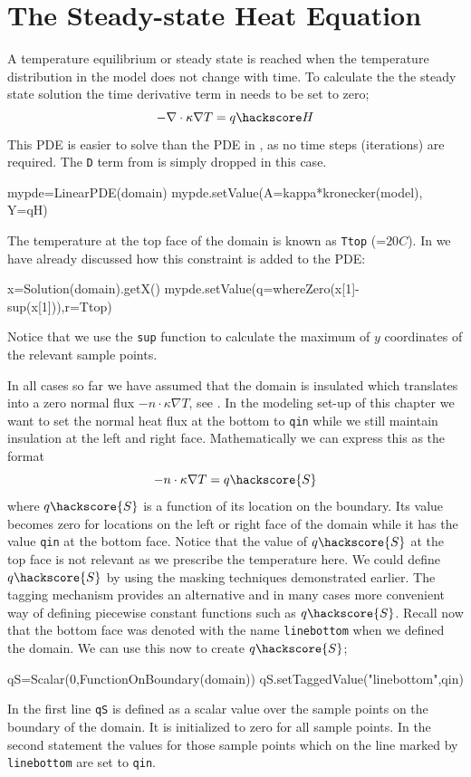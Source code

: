 \section{The Steady-state Heat Equation}
A temperature equilibrium or steady state is reached when the temperature
distribution in the model does not change with time. To calculate the 
the steady state solution the time derivative term in 
needs to be set to zero;
\begin{equation}\label{eqn:Tform nabla steady}
-\nabla \cdot \kappa \nabla T = q\hackscore H
\end{equation}
This PDE is easier to solve than the PDE in , as no time
steps (iterations) are required. The \verb|D| term from  is
simply dropped in this case.
\begin{python}
mypde=LinearPDE(domain)
mypde.setValue(A=kappa*kronecker(model), Y=qH)
\end{python}
The temperature at the top face of the domain is known as \verb|Ttop| (=$20 C$).
In  we have 
already discussed how this constraint is added to the PDE:
\begin{python}
x=Solution(domain).getX()
mypde.setValue(q=whereZero(x[1]-sup(x[1])),r=Ttop)
\end{python}
Notice that we use the \verb|sup| function to calculate the maximum of $y$
coordinates of the relevant sample points.

In all cases so far we have assumed that the domain is insulated which
translates 
into a zero normal flux $-n \cdot \kappa \nabla T$, see . In
the modeling
set-up of this chapter we want to set the normal heat flux at the bottom to
\verb|qin| while we still
maintain insulation at the left and right face. Mathematically we can express
this as the format
\begin{equation}
-n \cdot \kappa \nabla T = q\hackscore{S}
\label{eq:inhom flux}
\end{equation}
where $q\hackscore{S}$ is a function of its location on the boundary. Its value
becomes zero
for locations on the left or right face of the domain while it has the value
\verb|qin| at the bottom face.
Notice that the value of $q\hackscore{S}$ at the top face is not relevant as we
prescribe the temperature here.
We could define $q\hackscore{S}$ by using the masking techniques demonstrated
earlier. The tagging mechanism provides an alternative and in many cases more
convenient way of defining piecewise 
constant functions such as $q\hackscore{S}$. Recall now that the bottom face was
denoted with the name \verb|linebottom| when we defined the domain. 
We can use this now to create $q\hackscore{S}$;
\begin{python}
qS=Scalar(0,FunctionOnBoundary(domain))
qS.setTaggedValue("linebottom",qin)
\end{python}
In the first line \verb|qS| is defined as a scalar value over the sample points
on the boundary of the domain. It is
initialized to zero for all sample points. In the second statement the values
for those sample points which
on the line marked by \verb|linebottom| are set to \verb|qin|. 

